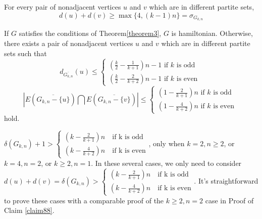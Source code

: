 \documentclass[reqno]{amsart}
\begin{document}
For every pair of nonadjacent vertices $u$ and $v$ which are in different partite sets,$$
d(u)+d(v) \geq \max \{4,(k-1) n\}=\sigma_{G_{k,n}}
$$

If $G$ satisfies the conditions of Theorem\ref{theorem3}, $G$ is hamiltonian. Otherwise, there exists a pair of nonadjacent vertices $u$ and $v$ which are in different partite sets such that
\begin{equation}
d_{\overline{G_{k,n}}}(u) \leq\left\{\begin{array}{l}
\left(\frac{k}{2}-\frac{1}{k+1}\right) n-1 \text { if } k \text { is odd } \\
\left(\frac{k}{2}-\frac{2}{k+2}\right) n-1 \text { if } k \text { is even }
\end{array}\right.
\end{equation}
\begin{equation}\label{eq1111}
\left|E(\overline{G_{k,n} - \{u\}}) \bigcap E(\overline{G_{k,n} - \{v\}})\right| \leq\left\{\begin{array}{l}
\left(1-\frac{2}{k+1}\right) n \text { if } k \text { is odd } \\
\left(1-\frac{4}{k+2}\right) n \text { if } k \text { is even }
\end{array}\right.
\end{equation}
hold.

$\delta(G_{k,n}) + 1>\left\{\begin{array}{l}\left(k-\frac{2}{k+1}\right) n \quad \text{if k is odd}\\ \left(k-\frac{4}{k+2}\right) n \quad \text{if k is even}\end{array}\right.$, only when $k=2,n \geq 2$, or $k=4,n=2$, or $k \geq 2,n=1$. In these several cases, we only need to consider $d(u)+d(v)=\delta(G_{k,n})>\left\{\begin{array}{l}\left(k-\frac{2}{k+1}\right) n \quad \text{if k is odd}\\ \left(k-\frac{4}{k+2}\right) n \quad \text{if k is even}\end{array}\right.$. It’s straightforward to prove these cases with a comparable proof of the $k \geq 2,n=2$ case in Proof of Claim \ref{claim88}.
\end{document}
